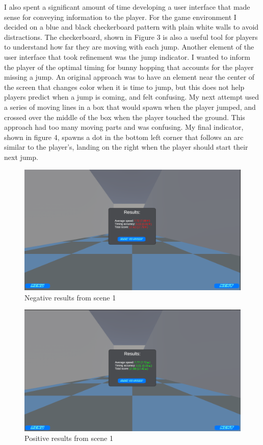 \documentclass[10pt,twocolumn]{article}
\begin{document}
I also spent a significant amount of time developing a user interface that made sense for conveying information to the player. For the game environment I decided on a blue and black checkerboard pattern with plain white walls to avoid distractions. The checkerboard, shown in Figure 3 is also a useful tool for players to understand how far they are moving with each jump. Another element of the user interface that took refinement was the jump indicator. I wanted to inform the player of the optimal timing for bunny hopping that accounts for the player missing a jump. An original approach was to have an element near the center of the screen that changes color when it is time to jump, but this does not help players predict when a jump is coming, and felt confusing. My next attempt used a series of moving lines in a box that would spawn when the player jumped, and crossed over the middle of the box when the player touched the ground. This approach had too many moving parts and was confusing. My final indicator, shown in figure 4, spawns a dot in the bottom left corner that follows an arc similar to the player's, landing on the right when the player should start their next jump. 

\begin{figure}
    \centering
    \includegraphics[width=1\linewidth]{resultsScreen.png}
    \caption{Negative results from scene 1}
\end{figure}
\begin{figure}
    \centering
    \includegraphics[width=1\linewidth]{resultsGood.png}
    \caption{Positive results from scene 1}
\end{figure}
\end{document}
